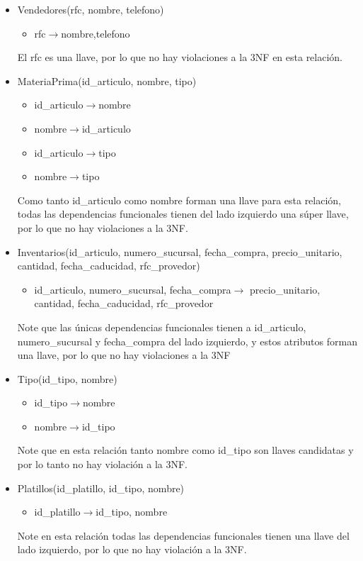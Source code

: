 \documentclass[11pt]{article}
\begin{document}
\begin{itemize}
\item Vendedores(rfc, nombre, telefono)
      \begin{itemize}
        \item rfc$\rightarrow$nombre,telefono
      \end{itemize}
      El rfc es una llave, por lo que no hay violaciones a la 3NF en esta relación.
\item MateriaPrima(id\_articulo, nombre, tipo)
      \begin{itemize}
        \item id\_articulo$\rightarrow$nombre
        \item nombre$\rightarrow$id\_articulo
        \item id\_articulo$\rightarrow$tipo
        \item nombre$\rightarrow$tipo
      \end{itemize}
      Como tanto id\_articulo como nombre forman una llave para esta relación, todas las dependencias funcionales tienen del lado izquierdo una súper llave, por lo que no hay violaciones a la 3NF.
\item Inventarios(id\_articulo, numero\_sucursal, fecha\_compra, precio\_unitario, cantidad, fecha\_caducidad, rfc\_provedor)
      \begin{itemize}
        \item id\_articulo, numero\_sucursal, fecha\_compra$\rightarrow$ precio\_unitario, cantidad, fecha\_caducidad, rfc\_provedor
      \end{itemize}
      Note que las únicas dependencias funcionales tienen a id\_articulo, numero\_sucursal y fecha\_compra del lado izquierdo, y estos atributos forman una llave, por lo que no hay violaciones a la 3NF
\item Tipo(id\_tipo, nombre)
      \begin{itemize}
        \item id\_tipo$\rightarrow$nombre
        \item nombre$\rightarrow$id\_tipo   
      \end{itemize}
      Note que en esta relación tanto nombre como id\_tipo son llaves candidatas y por lo tanto no hay violación a la 3NF. 
\item Platillos(id\_platillo, id\_tipo, nombre)
      \begin{itemize}
        \item id\_platillo$\rightarrow$id\_tipo, nombre
      \end{itemize}
      Note en esta relación todas las dependencias funcionales tienen una llave del lado izquierdo, por lo que no hay violación a la 3NF. 

\end{itemize}
\end{document}
